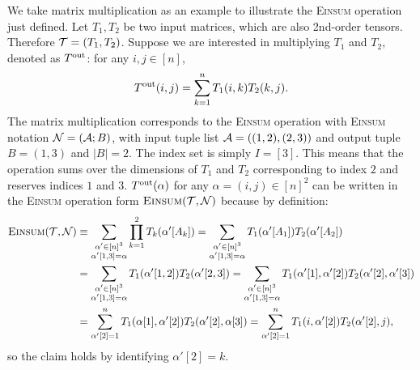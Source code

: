 \documentclass[letterpaper,11pt]{article}
\def\Einsum{\textsc{Einsum}}
\newcommand{\tensorcontraction}{\textsc{Einsum}}
\begin{document}
\begin{bibunit}[plainnat]
\begin{example}
\label{eg:matrix multiplication}
We take matrix multiplication as an example to illustrate the \Einsum{} operation just defined. Let $T_1, T_2$ be two input matrices, which are also 2nd-order tensors. Therefore ${\mathcal{T}} = (T_1, T_2)$. Suppose we are interested in multiplying $T_1$ and $T_2$, denoted as $T^{\rm out}$: for any $i, j \in [n]$,
\begin{equation*}
T^{\rm out} (i, j) = \sum_{k = 1}^n T_{1} (i, k) T_{2} (k, j). 
\end{equation*}
The matrix multiplication corresponds to the \Einsum{} operation with \Einsum{} notation ${\mathcal{N}} = ({\mathcal{A}}; B)$, with input tuple list ${\mathcal{A}} = ((1,2),(2,3))$ and output tuple $B = (1,3)$ and $|B| = 2$. The index set is simply $I = [3]$. This means that the operation sums over the dimensions of $T_1$ and $T_2$ corresponding to index $2$ and reserves indices $1$ and $3$. $T^{\rm out} (\alpha)$ for any $\alpha = (i, j) \in  [n]^{2}$ can be written in the \Einsum{} operation form $\tensorcontraction(\calT, \calN)$ because by definition:
\begin{align*}
\tensorcontraction(\calT, \calN) & \equiv \sum_{\substack{\alpha'  \in [n]^3 \\ \alpha' [1, 3] = \alpha}} \prod_{k = 1}^{2} T_k (\alpha' [A_k]) = \sum_{\substack{\alpha' 
\in [n]^3 \\ \alpha' [1, 3] = \alpha}} T_1 (\alpha' [A_1]) T_2 (\alpha' [A_2]) \\
& = \sum_{\substack{\alpha'  \in [n]^3 \\ \alpha' [1, 3] = \alpha}} T_1 (\alpha' [1, 2]) T_2 (\alpha' [2, 3]) = \sum_{\substack{\alpha'  \in [n]^3 \\ \alpha' [1, 3] = \alpha}} T_1 (\alpha' [1], \alpha' [2]) T_2 (\alpha' [2], \alpha'[3]) \\
& = \sum_{\alpha' [2] = 1}^{n} T_{1} (\alpha [1], \alpha' [2]) T_{2} (\alpha' [2], \alpha [3]) = \sum_{\alpha' [2] = 1}^{n} T_{1} (i, \alpha' [2]) T_{2} (\alpha' [2], j),
\end{align*}
so the claim holds by identifying $\alpha' [2] = k$.
\end{example}


\end{bibunit}
\end{document}
